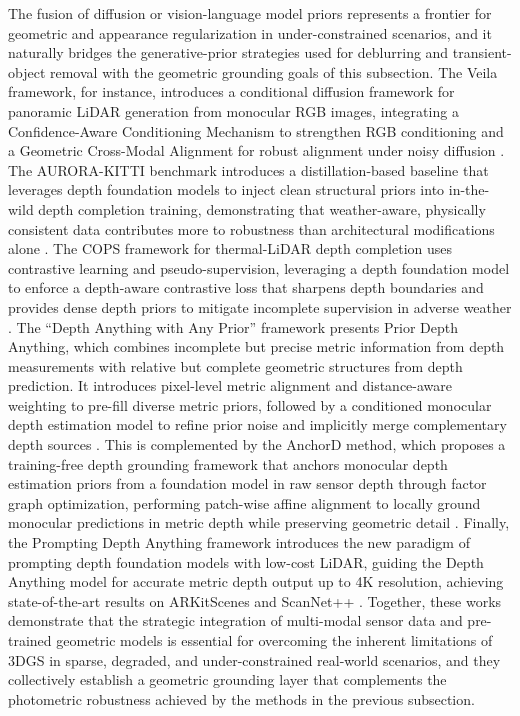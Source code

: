 \documentclass[11pt]{article}
\begin{document}
The fusion of diffusion or vision-language model priors represents a frontier for geometric and appearance regularization in under-constrained scenarios, and it naturally bridges the generative-prior strategies used for deblurring and transient-object removal with the geometric grounding goals of this subsection. The Veila framework, for instance, introduces a conditional diffusion framework for panoramic LiDAR generation from monocular RGB images, integrating a Confidence-Aware Conditioning Mechanism to strengthen RGB conditioning and a Geometric Cross-Modal Alignment for robust alignment under noisy diffusion \cite{ref319}. The AURORA-KITTI benchmark introduces a distillation-based baseline that leverages depth foundation models to inject clean structural priors into in-the-wild depth completion training, demonstrating that weather-aware, physically consistent data contributes more to robustness than architectural modifications alone \cite{ref320}. The COPS framework for thermal-LiDAR depth completion uses contrastive learning and pseudo-supervision, leveraging a depth foundation model to enforce a depth-aware contrastive loss that sharpens depth boundaries and provides dense depth priors to mitigate incomplete supervision in adverse weather \cite{ref321}. The ``Depth Anything with Any Prior'' framework presents Prior Depth Anything, which combines incomplete but precise metric information from depth measurements with relative but complete geometric structures from depth prediction. It introduces pixel-level metric alignment and distance-aware weighting to pre-fill diverse metric priors, followed by a conditioned monocular depth estimation model to refine prior noise and implicitly merge complementary depth sources \cite{ref322}. This is complemented by the AnchorD method, which proposes a training-free depth grounding framework that anchors monocular depth estimation priors from a foundation model in raw sensor depth through factor graph optimization, performing patch-wise affine alignment to locally ground monocular predictions in metric depth while preserving geometric detail \cite{ref323}. Finally, the Prompting Depth Anything framework introduces the new paradigm of prompting depth foundation models with low-cost LiDAR, guiding the Depth Anything model for accurate metric depth output up to 4K resolution, achieving state-of-the-art results on ARKitScenes and ScanNet++ \cite{ref307}. Together, these works demonstrate that the strategic integration of multi-modal sensor data and pre-trained geometric models is essential for overcoming the inherent limitations of 3DGS in sparse, degraded, and under-constrained real-world scenarios, and they collectively establish a geometric grounding layer that complements the photometric robustness achieved by the methods in the previous subsection.
\end{document}

